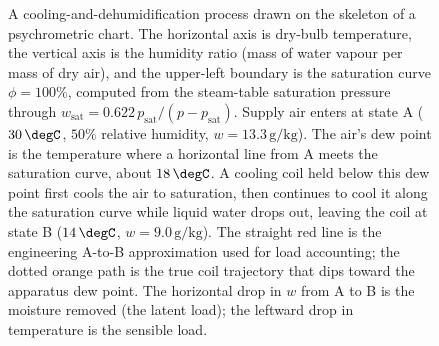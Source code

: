 \begin{figure}[htbp]
\caption[Cooling and dehumidification on a psychrometric chart]{A
cooling-and-dehumidification process drawn on the skeleton of a
psychrometric chart. The horizontal axis is dry-bulb temperature, the
vertical axis is the humidity ratio (mass of water vapour per mass of dry
air), and the upper-left boundary is the saturation curve $\phi=100\%$,
computed from the steam-table saturation pressure through
$w_{\text{sat}}=0.622\,p_{\text{sat}}/(p-p_{\text{sat}})$. Supply air enters
at state A ($30\,\degC$, $50\%$ relative humidity, $w=13.3\,\text{g}/
\text{kg}$). The air's dew point is the temperature where a horizontal line
from A meets the saturation curve, about $18\,\degC$. A cooling coil held
below this dew point first cools the air to saturation, then continues to
cool it along the saturation curve while liquid water drops out, leaving the
coil at state B ($14\,\degC$, $w=9.0\,\text{g}/\text{kg}$). The straight red
line is the engineering A-to-B approximation used for load accounting; the
dotted orange path is the true coil trajectory that dips toward the apparatus
dew point. The horizontal drop in $w$ from A to B is the moisture removed
(the latent load); the leftward drop in temperature is the sensible load.}
\label{fig:vol04ch02:psychrometric-process}
\end{figure}
